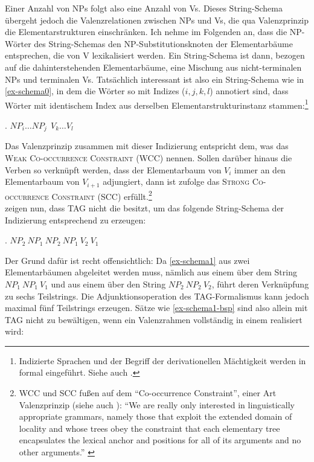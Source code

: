 Einer Anzahl von NPs folgt also eine Anzahl von Vs. Dieses String-Schema übergeht jedoch die Valenzrelationen zwischen NPs und Vs, die qua Valenzprinzip die Elementarstrukturen einschränken. Ich nehme im Folgenden an, dass die NP-Wörter des String-Schemas den NP-Substitutionsknoten der Elementarbäume entsprechen, die von V lexikalisiert werden. Ein String-Schema ist dann, bezogen auf die dahinterstehenden Elementarbäume, eine Mischung aus nicht-terminalen NPs und terminalen Vs. Tatsächlich interessant ist also ein String-Schema wie in \ref{ex-schema0}, in dem die Wörter so mit Indizes ($i,j,k,l$) annotiert sind, dass Wörter mit identischem Index aus derselben Elementarstrukturinstanz stammen:\footnote{Indizierte Sprachen und der Begriff der derivationellen Mächtigkeit werden in \cite{Becker:Rambow:Niv:92} formal eingeführt. Siehe auch \citet[41]{Rambow:94}.}

\ex. $\mathit{NP}_i \ldots \mathit{NP}_j ~~ V_k \ldots V_l$ \label{ex-schema0}   

Das  Valenzprinzip zusammen mit dieser Indizierung entspricht dem, was \citet[175]{Joshi:Becker:Rambow:00} das \textsc{Weak Co-occurrence Constraint (WCC)} nennen. Sollen darüber hinaus die  Verben so verknüpft werden, dass der Elementarbaum von $V_i$ immer an den Elementarbaum von $V_{i+1}$ adjungiert, dann ist \citet[177]{Joshi:Becker:Rambow:00} zufolge das \textsc{Strong Co-occurrence Constraint (SCC)} erfüllt.\footnote{\label{fn-wcc-scc}WCC und SCC fu\ss en auf dem "`Co-occurrence Constraint"', einer Art Valenzprinzip (siehe auch \citealt[22]{Becker:Joshi:Rambow:91}): "`We are really only interested in linguistically appropriate grammars, namely those that exploit the extended domain of locality and whose trees obey the constraint that each elementary tree encapsulates the lexical anchor and positions for all of its arguments and no other arguments."' \citep[175]{Joshi:Becker:Rambow:00}} \\

\cite{Becker:Joshi:Rambow:91} zeigen nun, dass TAG nicht die  besitzt, um das folgende String-Schema der Indizierung entsprechend zu erzeugen:

\ex. $\mathit{NP}_2 ~ \mathit{NP}_1 ~ \mathit{NP}_2 ~ \mathit{NP}_1 ~ V_2 ~ V_1$ \label{ex-schema1}

Der Grund dafür ist recht offensichtlich: Da \ref{ex-schema1} aus zwei Elementarbäumen abgeleitet werden muss, nämlich aus einem über dem String $\mathit{NP}_1 ~ \mathit{NP}_1 ~ V_1$ und aus einem über den String $\mathit{NP}_2 ~ \mathit{NP}_2 ~ V_2$, führt deren Verknüpfung zu sechs Teilstrings. Die Adjunktionsoperation des TAG-Formalismus kann jedoch maximal fünf Teilstrings erzeugen. Sätze wie \ref{ex-schema1-bsp} sind also allein mit TAG nicht zu bewältigen, wenn ein Valenzrahmen vollständig in einem  realisiert wird:

